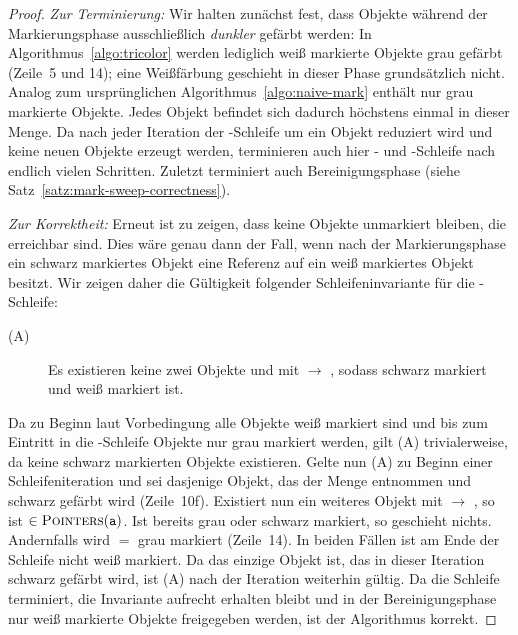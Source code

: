 \begin{proof}
	\textit{Zur Terminierung:} Wir halten zunächst fest, dass Objekte während der Markierungsphase ausschließlich \textit{dunkler} gefärbt werden:
	In Algorithmus~\ref{algo:tricolor} werden lediglich weiß markierte Objekte grau gefärbt (Zeile~5 und 14); eine Weißfärbung geschieht in dieser Phase grundsätzlich nicht.
	Analog zum ursprünglichen Algorithmus~\ref{algo:naive-mark} enthält  nur grau markierte Objekte.
	Jedes Objekt befindet sich dadurch höchstens einmal in dieser Menge.
	Da  nach jeder Iteration der \WHILE-Schleife um ein Objekt reduziert wird und keine neuen Objekte erzeugt werden, terminieren auch hier \WHILE- und \FOREACH-Schleife nach endlich vielen Schritten.
	Zuletzt terminiert auch Bereinigungsphase (siehe Satz~\ref{satz:mark-sweep-correctness}).
	
	\textit{Zur Korrektheit:} Erneut ist zu zeigen, dass keine Objekte unmarkiert bleiben, die erreichbar sind.
	Dies wäre genau dann der Fall, wenn nach der Markierungsphase ein schwarz markiertes Objekt eine Referenz auf ein weiß markiertes Objekt besitzt.
	Wir zeigen daher die Gültigkeit folgender Schleifeninvariante für die \WHILE-Schleife:
	\begin{description}
		\item[(A)] Es existieren keine zwei Objekte  und  mit  $\rightarrow$ , sodass  schwarz markiert und  weiß markiert ist.
	\end{description}
	Da zu Beginn laut Vorbedingung alle Objekte weiß markiert sind und bis zum Eintritt in die \WHILE-Schleife Objekte nur grau markiert werden, gilt (A) trivialerweise, da keine schwarz markierten Objekte existieren.
	Gelte nun (A) zu Beginn einer Schleifeniteration und sei  dasjenige Objekt, das der Menge  entnommen und schwarz gefärbt wird (Zeile~10f).
	Existiert nun ein weiteres Objekt  mit  $\rightarrow$ , so ist  $\in \textsc{Pointers}(\texttt{a})$.
	Ist  bereits grau oder schwarz markiert, so geschieht nichts.
	Andernfalls wird  $=$  grau markiert (Zeile~14).
	In beiden Fällen ist  am Ende der Schleife nicht weiß markiert.
	Da  das einzige Objekt ist, das in dieser Iteration schwarz gefärbt wird, ist (A) nach der Iteration weiterhin gültig.
	Da die Schleife terminiert, die Invariante aufrecht erhalten bleibt und in der Bereinigungsphase nur weiß markierte Objekte freigegeben werden, ist der Algorithmus korrekt.
\end{proof}

